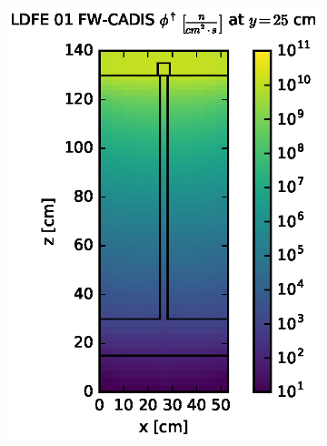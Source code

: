 \begin{figure}[!htb]
\begin{subfigure}{0.4\textwidth}
\includegraphics[max height=0.445\textheight]
{img/steel-plots/fwc-adj/flux-ldfe01-slice.eps}
\end{subfigure} ~
\begin{subfigure}{0.4\textwidth}

\end{subfigure}
\end{figure}
